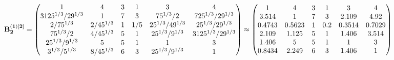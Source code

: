 \documentclass[10pt,a4paper]{article}
\begin{document}
	\[
		\bold{B_2^{(1)[2]}} = 
		\begin{pmatrix}
			{1}{} & {{4}}{} & {{3}}{} & {1}{} & {{3}}{} & {{4}}{} \\
			{{3125^ {1 / 3}}} / {{2}{9^ {1 / 3}}} & {1}{} & {{7}}{} & {{3}}{} & {{75^ {1 / 3}}} / {{2}} & {{7}{25^ {1 / 3}}} / {{2}{9^ {1 / 3}}} \\
			{{2}} / {{75^ {1 / 3}}} & {{2}} / {{45^ {1 / 3}}} & {1}{} & {1} / {{5}} & {{25^ {1 / 3}}} / {{4}{9^ {1 / 3}}} & {{25^ {1 / 3}}} / {{2}{9^ {1 / 3}}} \\
			{{75^ {1 / 3}}} / {{2}} & {{4}} / {{45^ {1 / 3}}} & {{5}}{} & {1}{} & {{25^ {1 / 3}}} / {{9^ {1 / 3}}} & {{3125^ {1 / 3}}} / {{2}{9^ {1 / 3}}} \\
			{{25^ {1 / 3}}} / {{9^ {1 / 3}}} & {{5}}{} & {{5}}{} & {1}{} & {1}{} & {{3}}{} \\
			{{3^ {1 / 3}}} / {{5^ {1 / 3}}} & {{8}} / {{45^ {1 / 3}}} & {{6}}{} & {{3}}{} & {{25^ {1 / 3}}} / {{9^ {1 / 3}}} & {1}{} \\
		\end{pmatrix}
		\approx
		\begin{pmatrix}
			1        & 4        & 3        & 1        & 3        & 4        \\
			3.514    & 1        & 7        & 3        & 2.109    & 4.92     \\
			0.4743   & 0.5623   & 1        & 0.2      & 0.3514   & 0.7029   \\
			2.109    & 1.125    & 5        & 1        & 1.406    & 3.514    \\
			1.406    & 5        & 5        & 1        & 1        & 3        \\
			0.8434   & 2.249    & 6        & 3        & 1.406    & 1        \\
		\end{pmatrix}
	\]
\end{document}
